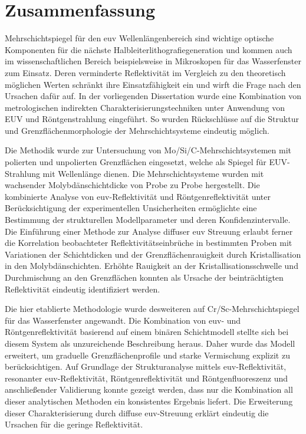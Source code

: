 \cleardoublepage

\thispagestyle{empty}

\section*{Zusammenfassung}

    Mehrschichtspiegel für den \gls{euv} Wellenlängenbereich sind wichtige optische Komponenten für die nächste Halbleiterlithografiegeneration und kommen auch im wissenschaftlichen Bereich beispielsweise in Mikroskopen für das Wasserfenster zum Einsatz. Deren verminderte Reflektivität im Vergleich zu den theoretisch möglichen Werten schränkt ihre Einsatzfähigkeit ein und wirft die Frage nach den Ursachen dafür auf. In der vorliegenden Dissertation wurde eine Kombination von metrologischen indirekten Charakterisierungstechniken unter Anwendung von EUV und Röntgenstrahlung eingeführt. So wurden Rückschlüsse auf die Struktur und Grenzflächenmorphologie der Mehrschichtsysteme eindeutig möglich.

    Die Methodik wurde zur Untersuchung von Mo/Si/C-Mehrschichtsystemen mit polierten und unpolierten Grenzflächen eingesetzt, welche als Spiegel für EUV-Strahlung mit  Wellenlänge dienen. Die Mehrschichtsysteme wurden mit wachsender Molybdänschichtdicke von Probe zu Probe hergestellt. Die kombinierte Analyse von \gls{euv}-Reflektivität und Röntgenreflektivität unter Berücksichtigung der experimentellen Unsicherheiten ermöglichte eine Bestimmung der strukturellen Modellparameter und deren Konfidenzintervalle. Die Einführung einer Methode zur Analyse diffuser \gls{euv} Streuung erlaubt ferner die Korrelation beobachteter Reflektivitätseinbrüche in bestimmten Proben mit Variationen der Schichtdicken und der Grenzflächenrauigkeit durch Kristallisation in den Molybdänschichten. Erhöhte Rauigkeit an der Kristallisationsschwelle und Durchmischung an den Grenzflächen konnten als Ursache der beinträchtigten Reflektivität eindeutig identifiziert werden.

    Die hier etablierte Methodologie wurde desweiteren auf Cr/Sc-Mehrschichtspiegel für das Wasserfenster angewandt. Die Kombination von \gls{euv}- und Röntgenreflektivität basierend auf einem binären Schichtmodell stellte sich bei diesem System als unzureichende Beschreibung heraus. Daher wurde das Modell erweitert, um graduelle Grenzflächenprofile und starke Vermischung explizit zu berücksichtigen. Auf Grundlage der Strukturanalyse mittels \gls{euv}-Reflektivität, resonanter \gls{euv}-Reflektivität, Röntgenreflektivität und Röntgenfluoreszenz und anschließender Validierung konnte gezeigt werden, dass nur die Kombination all dieser analytischen Methoden ein konsistentes Ergebnis liefert. Die Erweiterung dieser Charakterisierung durch diffuse \gls{euv}-Streuung erklärt eindeutig die Ursachen für die geringe Reflektivität.

\cleardoublepage
